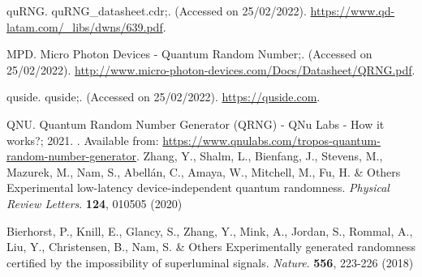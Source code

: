 \documentclass[]{interact}
\theoremstyle{plain}%
\theoremstyle{definition}
\theoremstyle{remark}
\begin{document}
\begin{thebibliography}{100}
quRNG. quRNG\_datasheet.cdr;.
\newblock (Accessed on 25/02/2022).
\newblock \url{https://www.qd-latam.com/_libs/dwns/639.pdf}.

MPD. Micro Photon Devices - Quantum Random Number;.
\newblock (Accessed on 25/02/2022).
\newblock \url{http://www.micro-photon-devices.com/Docs/Datasheet/QRNG.pdf}.

quside. quside;.
\newblock (Accessed on 25/02/2022).
\newblock \url{https://quside.com}.

QNU. {Quantum Random Number Generator (QRNG) - QNu Labs - How it works?}; 2021.
.
\newblock Available from:
  \url{https://www.qnulabs.com/tropos-quantum-random-number-generator}.
  Zhang, Y., Shalm, L., Bienfang, J., Stevens, M., Mazurek, M., Nam, S., Abellán, C., Amaya, W., Mitchell, M., Fu, H. \& Others Experimental low-latency device-independent quantum randomness. {\em Physical Review Letters}. \textbf{124}, 010505 (2020)

Bierhorst, P., Knill, E., Glancy, S., Zhang, Y., Mink, A., Jordan, S., Rommal, A., Liu, Y., Christensen, B., Nam, S. \& Others Experimentally generated randomness certified by the impossibility of superluminal signals. {\em Nature}. \textbf{556}, 223-226 (2018)
\end{thebibliography}
\end{document}
